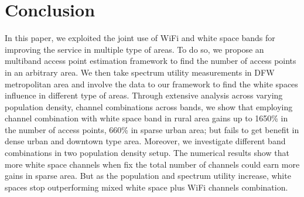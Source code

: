 \section{Conclusion}
\label{sec:conclusion}
In this paper, we exploited the joint use of WiFi and white space bands for 
improving the service in multiple type of areas.  To do so, we
propose an multiband access point estimation framework to find the number of access points in an arbitrary area.
We then take spectrum utility measurements in DFW metropolitan area and involve the data to 
our framework to find the white spaces influence in different type of areas. Through 
extensive analysis across varying population density, channel combinations across bands, 
we show that employing channel combination with white space band in rural area gains up to 1650\% in the number of 
access points, 660\% in sparse urban area; but fails to get benefit in dense urban and downtown type area.
Moreover, we investigate different band combinations in two population density setup. The numerical results show that 
more white space channels when fix the total number of channels could earn more gains in sparse
area. But as the population and spectrum utility increase, white spaces stop outperforming
mixed white space plus WiFi channels combination.


